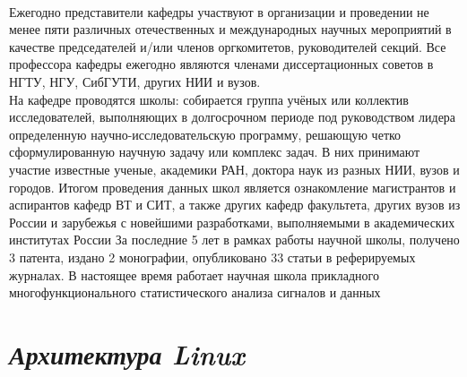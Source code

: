 \documentclass[12pt,a4paper]{article}
\begin{document}
\begin{flushleft}
\begin{flushleft}
\\
Ежегодно представители кафедры участвуют в организации и проведении не менее пяти различных отечественных и международных научных мероприятий в качестве председателей и/или членов оргкомитетов, руководителей секций. Все профессора кафедры ежегодно являются членами диссертационных советов в НГТУ, НГУ, СибГУТИ, других НИИ и вузов.
\\
На кафедре проводятся школы: собирается группа учёных или коллектив исследователей, выполняющих в долгосрочном периоде под руководством лидера определенную научно-исследовательскую программу, решающую четко сформулированную научную задачу или комплекс задач. В них принимают участие известные ученые, академики РАН, доктора наук из разных НИИ, вузов и городов. Итогом проведения данных школ является ознакомление магистрантов и аспирантов кафедр ВТ и СИТ, а также других кафедр факультета, других вузов из России и зарубежья с новейшими разработками, выполняемыми в академических институтах России За последние 5 лет в рамках работы научной школы, получено 3 патента, издано 2 монографии, опубликовано 33 статьи в реферируемых журналах. В настоящее время работает научная школа прикладного многофункционального статистического анализа сигналов и данных
\end{flushleft}


\section{\textit{Архитектура Linux}}
\subsection{}
\subsection{}

\end{flushleft}
\end{document}

